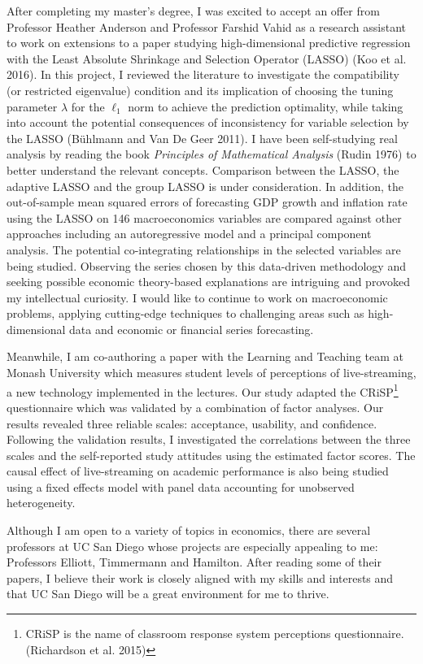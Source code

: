 \documentclass[12pt,]{article}
\let\rmarkdownfootnote\footnote%
\def\footnote{\protect\rmarkdownfootnote}
\begin{document}
After completing my master's degree, I was excited to accept an offer
from Professor Heather Anderson and Professor Farshid Vahid as a
research assistant to work on extensions to a paper studying
high-dimensional predictive regression with the Least Absolute Shrinkage
and Selection Operator (LASSO) (Koo et al. 2016). In this project, I
reviewed the literature to investigate the compatibility (or restricted
eigenvalue) condition and its implication of choosing the tuning
parameter \(\lambda\) for the \(\ell_1\) norm to achieve the prediction
optimality, while taking into account the potential consequences of
inconsistency for variable selection by the LASSO (Bühlmann and Van De
Geer 2011). I have been self-studying real analysis by reading the book
\emph{Principles of Mathematical Analysis} (Rudin 1976) to better
understand the relevant concepts. Comparison between the LASSO, the
adaptive LASSO and the group LASSO is under consideration. In addition,
the out-of-sample mean squared errors of forecasting GDP growth and
inflation rate using the LASSO on 146 macroeconomics variables are
compared against other approaches including an autoregressive model and
a principal component analysis. The potential co-integrating
relationships in the selected variables are being studied. Observing the
series chosen by this data-driven methodology and seeking possible
economic theory-based explanations are intriguing and provoked my
intellectual curiosity. I would like to continue to work on
macroeconomic problems, applying cutting-edge techniques to challenging
areas such as high-dimensional data and economic or financial series
forecasting.

Meanwhile, I am co-authoring a paper with the Learning and Teaching team
at Monash University which measures student levels of perceptions of
live-streaming, a new technology implemented in the lectures. Our study
adapted the CRiSP\footnote{CRiSP is the name of classroom response
  system perceptions questionnaire. (Richardson et al. 2015)}
questionnaire which was validated by a combination of factor analyses.
Our results revealed three reliable scales: acceptance, usability, and
confidence. Following the validation results, I investigated the
correlations between the three scales and the self-reported study
attitudes using the estimated factor scores. The causal effect of
live-streaming on academic performance is also being studied using a
fixed effects model with panel data accounting for unobserved
heterogeneity.

Although I am open to a variety of topics in economics, there are
several professors at UC San Diego whose projects are especially
appealing to me: Professors Elliott, Timmermann and Hamilton. After
reading some of their papers, I believe their work is closely aligned
with my skills and interests and that UC San Diego will be a great
environment for me to thrive.
\end{document}
